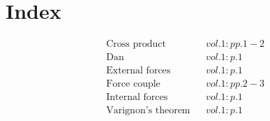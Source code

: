 \documentclass[a4paper]{article}
\begin{document}
 
\section*{Index} 
\begin{align*} 
&\text{Cross product}&& vol. 1: pp. 1-2\\
&\text{Dan}&& vol. 1: p. 1\\
&\text{External forces}&& vol. 1: p. 1\\
&\text{Force couple}&& vol. 1: pp. 2-3\\
&\text{Internal forces}&& vol. 1: p. 1\\
&\text{Varignon's theorem}&& vol. 1: p. 1\\
\end{align*} 
\end{document}
